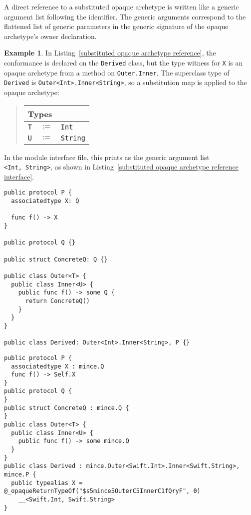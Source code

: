 \documentclass[a4paper,headsepline,bibliography=totoc,toc=flat,fleqn,twoside=semi]{scrbook}
\theoremstyle{definition}
\theoremstyle{definition}
\newtheorem{example}{Example}[chapter]
\theoremstyle{definition}
\newcommand{\SubMap}[1]{\begin{tabular}{|lll|}
\hline
\multicolumn{3}{|l|}{\textbf{Types}}\\
\hline
#1\\
\hline
\end{tabular}}
\newcommand{\SubType}[2]{\texttt{#1}&$:=$&\texttt{#2}}
\begin{document}
A direct reference to a substituted opaque archetype is written like a generic argument list following the identifier. The generic arguments correspond to the flattened list of generic parameters in the generic signature of the opaque archetype's owner declaration.

\begin{example}
In Listing~\ref{substituted opaque archetype reference}, the conformance is declared on the \texttt{Derived} class, but the type witness for \texttt{X} is an opaque archetype from a method on \texttt{Outer.Inner}. The superclass type of \texttt{Derived} is \texttt{Outer<Int>.Inner<String>}, so a substitution map is applied to the opaque archetype:
\begin{quote}
\SubMap{
\SubType{T}{Int}\\
\SubType{U}{String}
}
\end{quote}
In the module interface file, this prints as the generic argument list \texttt{<Int,~String>}, as shown in Listing~\ref{substituted opaque archetype reference interface}.
\end{example}
\begin{listing}\label{substituted opaque archetype reference}
\begin{Verbatim}
public protocol P {
  associatedtype X: Q

  func f() -> X
}

public protocol Q {}

public struct ConcreteQ: Q {}

public class Outer<T> {
  public class Inner<U> {
    public func f() -> some Q {
      return ConcreteQ()
    }
  }
}

public class Derived: Outer<Int>.Inner<String>, P {}
\end{Verbatim}
\end{listing}
\begin{listing}\label{substituted opaque archetype reference interface}
\begin{Verbatim}
public protocol P {
  associatedtype X : mince.Q
  func f() -> Self.X
}
public protocol Q {
}
public struct ConcreteQ : mince.Q {
}
public class Outer<T> {
  public class Inner<U> {
    public func f() -> some mince.Q
  }
}
public class Derived : mince.Outer<Swift.Int>.Inner<Swift.String>, mince.P {
  public typealias X = @_opaqueReturnTypeOf("$s5mince5OuterC5InnerC1fQryF", 0)
    __<Swift.Int, Swift.String>
}
\end{Verbatim}
\end{listing}
\end{document}
